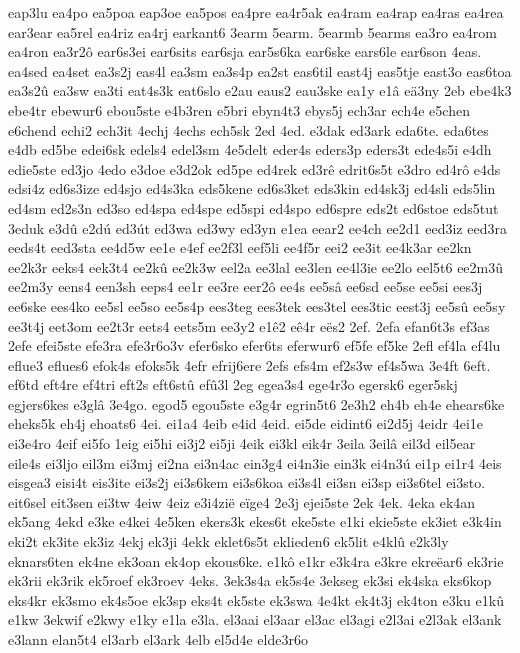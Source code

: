{eap3lu
ea4po
ea5poa
eap3oe
ea5pos
ea4pre
ea4r5ak
ea4ram
ea4rap
ea4ras
ea4rea
ear3ear
ea5rel
ea4riz
ea4rj
earkant6
3earm
5earm.
5earmb
5earms
ea3ro
ea4rom
ea4ron
ea3r2ô
ear6s3ei
ear6sits
ear6sja
ear5s6ka
ear6ske
ears6le
ear6son
4eas.
ea4sed
ea4set
ea3s2j
eas4l
ea3sm
ea3s4p
ea2st
eas6til
east4j
eas5tje
east3o
eas6toa
ea3s2û
ea3sw
ea3ti
eat4s3k
eat6slo
e2au
eaus2
eau3ske
ea1y
e1â
eä3ny
2eb
ebe4k3
ebe4tr
ebewur6
ebou5ste
e4b3ren
e5bri
ebyn4t3
ebys5j
ech3ar
ech4e
e5chen
e6chend
echi2
ech3it
4echj
4echs
ech5sk
2ed
4ed.
e3dak
ed3ark
eda6te.
eda6tes
e4db
ed5be
edei6sk
edels4
edel3sm
4e5delt
eder4s
eders3p
eders3t
ede4s5i
e4dh
edie5ste
ed3jo
4edo
e3doe
e3d2ok
ed5pe
ed4rek
ed3rê
edrit6s5t
e3dro
ed4rô
e4ds
edsi4z
ed6s3ize
ed4sjo
ed4s3ka
eds5kene
ed6s3ket
eds3kin
ed4sk3j
ed4sli
eds5lin
ed4sm
ed2s3n
ed3so
ed4spa
ed4spe
ed5spi
ed4spo
ed6spre
eds2t
ed6stoe
eds5tut
3eduk
e3dû
e2dú
ed3út
ed3wa
ed3wy
ed3yn
e1ea
eear2
ee4ch
ee2d1
eed3iz
eed3ra
eeds4t
eed3sta
ee4d5w
ee1e
e4ef
ee2f3l
eef5li
ee4f5r
eei2
ee3it
ee4k3ar
ee2kn
ee2k3r
eeks4
eek3t4
ee2kû
ee2k3w
eel2a
ee3lal
ee3len
ee4l3ie
ee2lo
eel5t6
ee2m3û
ee2m3y
eens4
een3sh
eeps4
ee1r
ee3re
eer2ô
ee4s
ee5sâ
ee6sd
ee5se
ee5si
ees3j
ee6ske
ees4ko
ee5sl
ee5so
ee5s4p
ees3teg
ees3tek
ees3tel
ees3tic
eest3j
ee5sû
ee5sy
ee3t4j
eet3om
ee2t3r
eets4
eets5m
ee3y2
e1ê2
eê4r
eës2
2ef.
2efa
efan6t3s
ef3as
2efe
efei5ste
efe3ra
efe3r6o3v
efer6sko
efer6ts
eferwur6
ef5fe
ef5ke
2efl
ef4la
ef4lu
eflue3
eflues6
efok4s
efoks5k
4efr
efrij6ere
2efs
efs4m
ef2s3w
ef4s5wa
3e4ft
6eft.
ef6td
eft4re
ef4tri
eft2s
eft6stû
efû3l
2eg
egea3s4
ege4r3o
egersk6
eger5skj
egjers6kes
e3glâ
3e4go.
egod5
egou5ste
e3g4r
egrin5t6
2e3h2
eh4b
eh4e
ehears6ke
eheks5k
eh4j
ehoats6
4ei.
ei1a4
4eib
e4id
4eid.
ei5de
eidint6
ei2d5j
4eidr
4ei1e
ei3e4ro
4eif
ei5fo
1eig
ei5hi
ei3j2
ei5ji
4eik
ei3kl
eik4r
3eila
3eilâ
eil3d
eil5ear
eile4s
ei3ljo
eil3m
ei3mj
ei2na
ei3n4ac
ein3g4
ei4n3ie
ein3k
ei4n3ú
ei1p
ei1r4
4eis
eisgea3
eisi4t
eis3ite
ei3s2j
ei3s6kem
ei3s6koa
ei3s4l
ei3sn
ei3sp
ei3s6tel
ei3sto.
eit6sel
eit3sen
ei3tw
4eiw
4eiz
e3i4zië
eïge4
2e3j
ejei5ste
2ek
4ek.
4eka
ek4an
ek5ang
4ekd
e3ke
e4kei
4e5ken
ekers3k
ekes6t
eke5ste
e1ki
ekie5ste
ek3iet
e3k4in
eki2t
ek3ite
ek3iz
4ekj
ek3ji
4ekk
eklet6s5t
eklieden6
ek5lit
e4klû
e2k3ly
eknars6ten
ek4ne
ek3oan
ek4op
ekous6ke.
e1kô
e1kr
e3k4ra
e3kre
ekreëar6
ek3rie
ek3rii
ek3rik
ek5roef
ek3roev
4eks.
3ek3s4a
ek5s4e
3ekseg
ek3si
ek4ska
eks6kop
eks4kr
ek3smo
ek4s5oe
ek3sp
eks4t
ek5ste
ek3swa
4e4kt
ek4t3j
ek4ton
e3ku
e1kû
e1kw
3ekwif
e2kwy
e1ky
e1la
e3la.
el3aai
el3aar
el3ac
el3agi
e2l3ai
e2l3ak
el3ank
e3lann
elan5t4
el3arb
el3ark
4elb
el5d4e
elde3r6o
}
